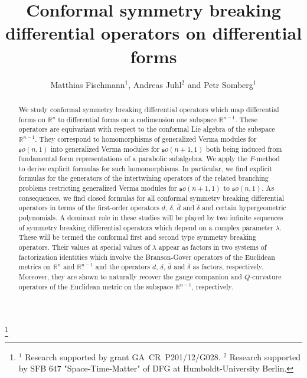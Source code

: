 \documentclass[a4paper,12pt,reqno]{amsart}
\numberwithin{theorem}{subsection}
\numberwithin{equation}{section}
\begin{document}
\title[Symmetry breaking operators on differential forms]
{Conformal symmetry breaking differential operators on differential forms}

\author[Matthias Fischmann, Andreas Juhl and Petr Somberg]
{Matthias Fischmann$^1$, Andreas Juhl$^2$ and Petr Somberg$^1$}

\address{$^1$ E. \v{C}ech Institute, Mathematical Institute of Charles University,
Sokolovsk\'a 83, Praha 8 - Karl\'{\i}n, Czech Republic}


\address{$^2$ Humboldt-Universit\"at, Institut f\"ur Mathematik, Unter den Linden
6, 10099 Berlin, Germany}




\thanks{$^{1}$ Research supported by grant GA~CR~P201/12/G028.
\newline \indent
$^2$ Research supported by SFB $647$ "Space-Time-Matter" of DFG at
Humboldt-University Berlin.}

\begin{abstract}
We study conformal symmetry breaking differential operators which map
differential forms on ${\mathbb{R}}^n$ to differential forms on a codimension one
subspace ${\mathbb{R}}^{n-1}$. These operators are equivariant with respect to the
conformal Lie algebra of the subspace ${\mathbb{R}}^{n-1}$. They correspond to
homomorphisms of generalized Verma modules for ${{\mathfrak so}}(n,1)$ into generalized
Verma modules for ${{\mathfrak so}}(n+1,1)$ both being induced from fundamental form
representations of a parabolic subalgebra. We apply the $F$-method to derive
explicit formulas for such homomorphisms. In particular, we find explicit
formulas for the generators of the intertwining operators of the related
branching problems restricting generalized Verma modules for ${{\mathfrak so}}(n+1,1)$ to
${{\mathfrak so}}(n,1)$. As consequences, we find closed formulas for all conformal
symmetry breaking differential operators in terms of the first-order operators
${d}$, $\delta$, $\bar{d}$ and $\bar{\delta}$ and certain hypergeometric
polynomials. A dominant role in these studies will be played by two infinite
sequences of symmetry breaking differential operators which depend on a complex
parameter $\lambda$. These will be termed the conformal first and second type
symmetry breaking operators. Their values at special values of $\lambda$ appear
as factors in two systems of factorization identities which involve the
Branson-Gover operators of the Euclidean metrics on ${\mathbb{R}}^n$ and ${\mathbb{R}}^{n-1}$ and
the operators ${d}$, $\delta$, $\bar{d}$ and $\bar{\delta}$ as factors,
respectively. Moreover, they are shown to naturally recover the gauge companion
and $Q$-curvature operators of the Euclidean metric on the subspace ${\mathbb{R}}^{n-1}$,
respectively.
\end{abstract}
\end{document}
